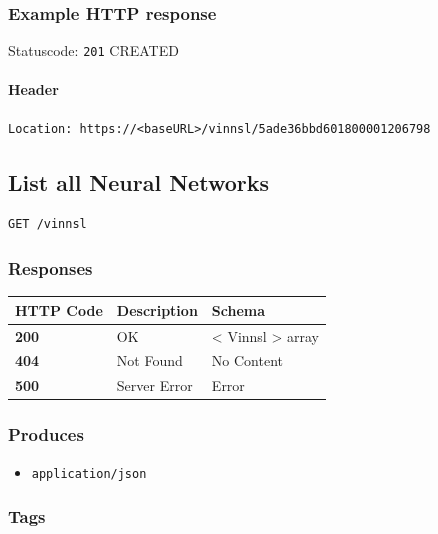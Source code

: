 \subsubsection{Example HTTP response}\label{example-http-response}

Statuscode: \texttt{201} CREATED

\paragraph{Header}\label{header-1}

\begin{verbatim}
Location: https://<baseURL>/vinnsl/5ade36bbd601800001206798
\end{verbatim}

\subsection{List all Neural Networks}\label{list-all-neural-networks}

\begin{verbatim}
GET /vinnsl
\end{verbatim}

\subsubsection{Responses}\label{responses-1}

\begin{longtable}[]{@{}lll@{}}
\toprule
HTTP Code & Description & Schema\tabularnewline
\midrule
\endhead
\textbf{200} & OK & \textless{} Vinnsl \textgreater{}
array\tabularnewline
\textbf{404} & Not Found & No Content\tabularnewline
\textbf{500} & Server Error & Error\tabularnewline
\bottomrule
\end{longtable}

\subsubsection{Produces}\label{produces-1}

\begin{itemize}
\tightlist
\item
  \texttt{application/json}
\end{itemize}

\subsubsection{Tags}\label{tags-1}

